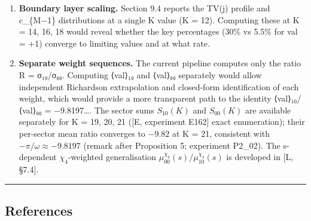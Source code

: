 \documentclass[
  11pt,
]{article}
\begin{document}
\begin{enumerate}
  {[}G{]}: the D-parity boundary is a straight line in angular coordinates iff b
  = 2, which explains why π enters only for binary multiplication. A systematic
  exact enumeration of R(K; b) for bases 3, 5, 7 would test whether R\_b is
  rational for all b ≥ 3.
\item
  \textbf{Boundary layer scaling.} Section 9.4 reports the TV(j) profile and
  c\_\{M−1\} distributions at a single K value (K = 12). Computing these at K =
  14, 16, 18 would reveal whether the key percentages (30\% vs 5.5\% for val =
  +1) converge to limiting values and at what rate.
\item
  \textbf{Separate weight sequences.} The current pipeline computes only the
  ratio R = σ₁₀/σ₀₀. Computing ⟨val⟩₁₀ and ⟨val⟩₀₀ separately would allow
  independent Richardson extrapolation and closed-form identification of each
  weight, which would provide a more transparent path to the identity
  ⟨val⟩₁₀/⟨val⟩₀₀ = −9.8197\ldots. The sector sums \(S_{10}(K)\) and
  \(S_{00}(K)\) are available separately for K = 19, 20, 21 ({[}E, experiment
  E162{]} exact enumeration); their per-sector mean ratio converges to \(-9.82\)
  at K = 21, consistent with \(-\pi/\omega \approx -9.8197\) (remark after
  Proposition 5; experiment P2\_02). The s-dependent \(\chi_4\)-weighted
  generalisation \(\mu_{00}^{\chi_4}(s)/\mu_{10}^{\chi_4}(s)\) is developed in
  {[}L, §7.4{]}.
\end{enumerate}

\begin{center}\rule{0.5\linewidth}{0.5pt}\end{center}

\newpage

\subsection{References}\label{references}
\end{document}
